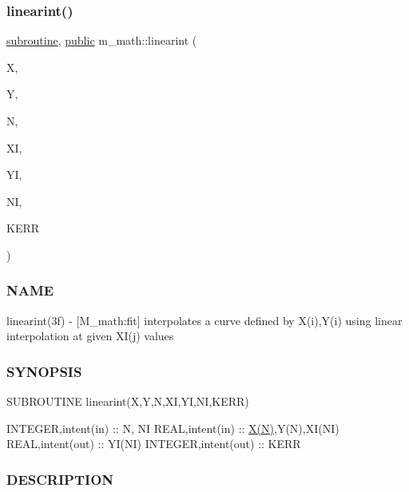 \subsubsection{\texorpdfstring{linearint()}{linearint()}}
{\footnotesize\ttfamily \hyperlink{M__stopwatch_83_8txt_acfbcff50169d691ff02d4a123ed70482}{subroutine}, \hyperlink{M__stopwatch_83_8txt_a2f74811300c361e53b430611a7d1769f}{public} m\+\_\+math\+::linearint (\begin{DoxyParamCaption}\item[{\hyperlink{read__watch_83_8txt_abdb62bde002f38ef75f810d3a905a823}{real}, dimension(n), intent(\hyperlink{M__journal_83_8txt_afce72651d1eed785a2132bee863b2f38}{in})}]{X,  }\item[{\hyperlink{read__watch_83_8txt_abdb62bde002f38ef75f810d3a905a823}{real}, dimension(n), intent(\hyperlink{M__journal_83_8txt_afce72651d1eed785a2132bee863b2f38}{in})}]{Y,  }\item[{integer, intent(\hyperlink{M__journal_83_8txt_afce72651d1eed785a2132bee863b2f38}{in})}]{N,  }\item[{\hyperlink{read__watch_83_8txt_abdb62bde002f38ef75f810d3a905a823}{real}, dimension(ni), intent(\hyperlink{M__journal_83_8txt_afce72651d1eed785a2132bee863b2f38}{in})}]{XI,  }\item[{\hyperlink{read__watch_83_8txt_abdb62bde002f38ef75f810d3a905a823}{real}, dimension(ni), intent(out)}]{YI,  }\item[{integer, intent(\hyperlink{M__journal_83_8txt_afce72651d1eed785a2132bee863b2f38}{in})}]{NI,  }\item[{integer, intent(out)}]{K\+E\+RR }\end{DoxyParamCaption})}



\subsubsection*{N\+A\+ME}

linearint(3f) -\/ \mbox{[}M\+\_\+math\+:fit\mbox{]} interpolates a curve defined by X(i),Y(i) using linear interpolation at given X\+I(j) values \subsubsection*{S\+Y\+N\+O\+P\+S\+IS}

S\+U\+B\+R\+O\+U\+T\+I\+NE linearint(\+X,\+Y,\+N,\+X\+I,\+Y\+I,\+N\+I,\+K\+E\+R\+R)

I\+N\+T\+E\+G\+ER,intent(in) \+:\+: N, NI R\+E\+AL,intent(in) \+:\+: \hyperlink{intro__blas1_83_8txt_ab4d967e4f300b736e32886d090808e29}{X(\+N)},Y(\+N),X\+I(\+N\+I) R\+E\+AL,intent(out) \+:\+: Y\+I(\+N\+I) I\+N\+T\+E\+G\+ER,intent(out) \+:\+: K\+E\+RR \subsubsection*{D\+E\+S\+C\+R\+I\+P\+T\+I\+ON}

